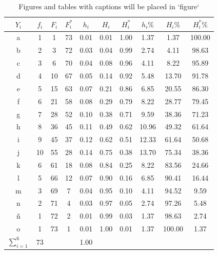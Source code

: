 \documentclass[10pt,]{krantz}
\theoremstyle{definition}
\theoremstyle{definition}
\theoremstyle{definition}
\theoremstyle{definition}
\theoremstyle{remark}
\begin{document}
\begin{longtable}[t]{cccccccccc}
\caption{\label{tab:2w3}Figures and tables with captions will be placed in `figure` }\\
\toprule
$Y_i$ & $f_i$ & $F_i$ & $F_i^*$ & $h_i$ & $H_i$ & $H_i^*$ & $h_i\%$ & $H_i\%$ & $H_i^*\%$\\
\midrule
a & 1 & 1 & 73 & 0.01 & 0.01 & 1.00 & 1.37 & 1.37 & 100.00\\
b & 2 & 3 & 72 & 0.03 & 0.04 & 0.99 & 2.74 & 4.11 & 98.63\\
c & 3 & 6 & 70 & 0.04 & 0.08 & 0.96 & 4.11 & 8.22 & 95.89\\
d & 4 & 10 & 67 & 0.05 & 0.14 & 0.92 & 5.48 & 13.70 & 91.78\\
e & 5 & 15 & 63 & 0.07 & 0.21 & 0.86 & 6.85 & 20.55 & 86.30\\
f & 6 & 21 & 58 & 0.08 & 0.29 & 0.79 & 8.22 & 28.77 & 79.45\\
g & 7 & 28 & 52 & 0.10 & 0.38 & 0.71 & 9.59 & 38.36 & 71.23\\
h & 8 & 36 & 45 & 0.11 & 0.49 & 0.62 & 10.96 & 49.32 & 61.64\\
i & 9 & 45 & 37 & 0.12 & 0.62 & 0.51 & 12.33 & 61.64 & 50.68\\
j & 10 & 55 & 28 & 0.14 & 0.75 & 0.38 & 13.70 & 75.34 & 38.36\\
k & 6 & 61 & 18 & 0.08 & 0.84 & 0.25 & 8.22 & 83.56 & 24.66\\
l & 5 & 66 & 12 & 0.07 & 0.90 & 0.16 & 6.85 & 90.41 & 16.44\\
m & 3 & 69 & 7 & 0.04 & 0.95 & 0.10 & 4.11 & 94.52 & 9.59\\
n & 2 & 71 & 4 & 0.03 & 0.97 & 0.05 & 2.74 & 97.26 & 5.48\\
ñ & 1 & 72 & 2 & 0.01 & 0.99 & 0.03 & 1.37 & 98.63 & 2.74\\
o & 1 & 73 & 1 & 0.01 & 1.00 & 0.01 & 1.37 & 100.00 & 1.37\\
$\sum_{i=1}^6$ & 73 &  &  & 1.00 &  &  &  &  & \\
\bottomrule
\end{longtable}
\end{document}
